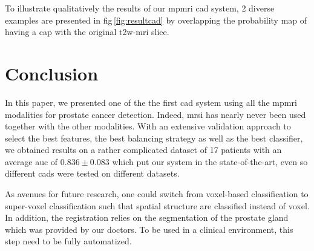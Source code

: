 \documentclass[conference]{sty/ieeeconf}
\begin{document}
To illustrate qualitatively the results of our \ac{mpmri} \ac{cad}
system, 2 diverse examples are presented in
\acs{fig}\,\ref{fig:resultcad} by overlapping the probability map of
having a \ac{cap} with the original \ac{t2w}-\ac{mri} slice.

\section{Conclusion}

In this paper, we presented one of the the first \ac{cad} system using all
the \ac{mpmri} modalities for prostate cancer detection.
Indeed, \ac{mrsi} has nearly never been used together with the other
modalities.
With an extensive validation approach to select the best
features, the best balancing strategy as well as the best classifier,
we obtained results on a rather complicated dataset of 17 patients
with an average \ac{auc} of $0.836 \pm 0.083$ which put our system in the
state-of-the-art, even so different \ac{cad}s were tested on different
datasets.

As avenues for future research, one could switch from voxel-based
classification to super-voxel classification such that spatial structure are
classified instead of voxel.
In addition, the registration relies on the segmentation of the prostate gland
which was provided by our doctors.
To be used in a clinical environment, this step need to be fully automatized.



\end{document}
